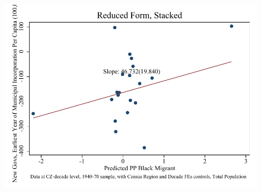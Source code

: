 \documentclass{article}
\begin{document}
\begin{figure}
\centering
\includegraphics{figures/simplefigs/stacked_cgoodman_pc_C3_total_rf.pdf}
\end{figure}
\clearpage
\end{document}
